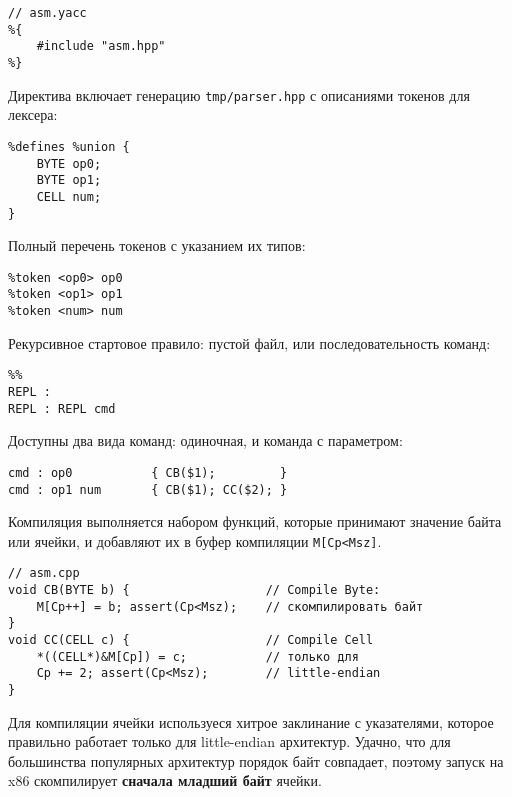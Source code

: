 \clearpage
{}

\begin{verbatim}// asm.yacc
%{
    #include "asm.hpp"
%}
\end{verbatim}
Директива включает генерацию \verb|tmp/parser.hpp| с описаниями токенов для лексера:
\begin{verbatim}
%defines %union {
    BYTE op0;
    BYTE op1;
    CELL num;
}
\end{verbatim}
\clearpage
\noindent
Полный перечень токенов с указанием их типов:
\begin{verbatim}
%token <op0> op0
%token <op1> op1
%token <num> num
\end{verbatim}
Рекурсивное стартовое правило: пустой файл, или последовательность команд:
\begin{verbatim}
%%
REPL :
REPL : REPL cmd
\end{verbatim}
Доступны два вида команд: одиночная, и команда с параметром:
\begin{verbatim}
cmd : op0           { CB($1);         }
cmd : op1 num       { CB($1); CC($2); }
\end{verbatim}

\noindent
Компиляция выполняется набором функций, которые принимают значение байта или
ячейки, и добавляют их в буфер компиляции \verb|M[Cp<Msz]|.

\begin{verbatim}// asm.cpp
void CB(BYTE b) {                   // Compile Byte:
    M[Cp++] = b; assert(Cp<Msz);    // скомпилировать байт
}
void CC(CELL c) {                   // Compile Cell
    *((CELL*)&M[Cp]) = c;           // только для
    Cp += 2; assert(Cp<Msz);        // little-endian
}
\end{verbatim}
Для компиляции ячейки используеся хитрое заклинание с указателями, которое
правильно работает только для little-endian архитектур. Удачно, что для
большинства популярных архитектур порядок байт совпадает, поэтому запуск на x86
скомпилирует \textbf{сначала младший байт} ячейки.
